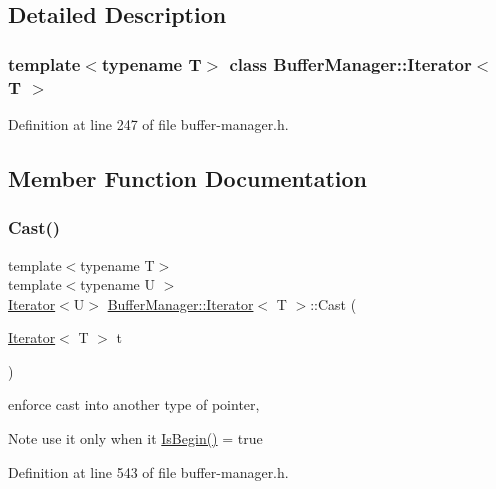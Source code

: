 \subsection{Detailed Description}
\subsubsection*{template$<$typename T$>$\newline
class Buffer\+Manager\+::\+Iterator$<$ T $>$}



Definition at line 247 of file buffer-\/manager.\+h.



\subsection{Member Function Documentation}
\mbox{\label{class_buffer_manager_1_1_iterator_aac3b1b6e41babe5e82814e69e040fd20}} 
\subsubsection{\texorpdfstring{Cast()}{Cast()}}
{\footnotesize\ttfamily template$<$typename T$>$ \\
template$<$typename U $>$ \\
\mbox{\hyperlink{class_buffer_manager_1_1_iterator}{Iterator}}$<$U$>$ \mbox{\hyperlink{class_buffer_manager_1_1_iterator}{Buffer\+Manager\+::\+Iterator}}$<$ T $>$\+::Cast (\begin{DoxyParamCaption}\item[{\mbox{\hyperlink{class_buffer_manager_1_1_iterator}{Iterator}}$<$ T $>$}]{t }\end{DoxyParamCaption})\hspace{0.3cm}{\ttfamily [inline]}}

enforce cast into another type of pointer, \begin{DoxyNote}{Note}
use it only when it {\ttfamily \mbox{\hyperlink{class_buffer_manager_1_1_iterator_a7ce4145bd6263f8003c4c4dee01a9c31}{Is\+Begin()}} = true} 
\end{DoxyNote}


Definition at line 543 of file buffer-\/manager.\+h.

\mbox{\label{class_buffer_manager_1_1_iterator_a2e9a59db2ef1289b16469750e422edd5}} 
